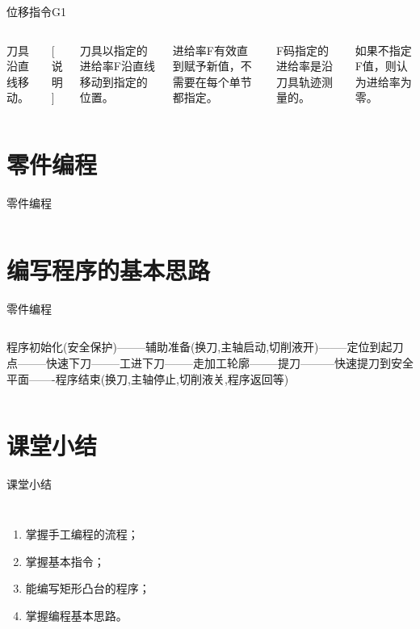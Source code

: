 \documentclass[UTF8,zihao=-4]{ctexbeamer}
\begin{document}
\begin{frame}{位移指令G1}
    \begin{columns}
        \column{\textwidth}
        刀具沿直线移动。
        
[ 说明 ]

刀具以指定的进给率F沿直线移动到指定的位置。

进给率F有效直到赋予新值，不需要在每个单节都指定。

F码指定的进给率是沿刀具轨迹测量的。

如果不指定F值，则认为进给率为零。
        
    \end{columns}
\end{frame}

\section{零件编程}

\begin{frame}{零件编程}
    \begin{columns}
        \column{\textwidth}
   
   
    \end{columns}
\end{frame}


\section{编写程序的基本思路}
\begin{frame}{零件编程}
    \begin{columns}
        \column{\textwidth}
 程序初始化(安全保护)--------辅助准备(换刀,主轴启动,切削液开)--------定位到起刀点--------快速下刀--------工进下刀--------走加工轮廓--------提刀---------快速提刀到安全平面-------程序结束(换刀,主轴停止,切削液关,程序返回等)       
        
    \end{columns}
\end{frame}



\section*{课堂小结}
\begin{frame}{课堂小结}
    \begin{columns}
\begin{enumerate}
\item 掌握手工编程的流程；
\item 掌握基本指令；
\item 能编写矩形凸台的程序；
\item 掌握编程基本思路。
\end{enumerate}
    \end{columns}
\end{frame}
\end{document}
